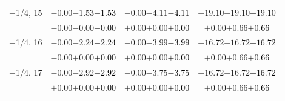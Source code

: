 \documentclass[compress]{beamer}
\begin{document}
\begin{frame}
\begin{tabular}{r | c | c | c}
$-$1/4, 15 & $-0.00$\hspace{0.1 cm}$-1.53$\hspace{0.1 cm}\textcolor{black}{$-1.53$} & $-0.00$\hspace{0.1 cm}$-4.11$\hspace{0.1 cm}\textcolor{black}{$-4.11$} & $+19.10$\hspace{0.1 cm}$+19.10$\hspace{0.1 cm}\textcolor{black}{$+19.10$} \\
           & $-0.00$\hspace{0.1 cm}$-0.00$\hspace{0.1 cm}\textcolor{black}{$-0.00$} & $+0.00$\hspace{0.1 cm}$+0.00$\hspace{0.1 cm}\textcolor{black}{$+0.00$} & $+0.00$\hspace{0.1 cm}$+0.66$\hspace{0.1 cm}\textcolor{black}{$+0.66$} \\
$-$1/4, 16 & $-0.00$\hspace{0.1 cm}$-2.24$\hspace{0.1 cm}\textcolor{black}{$-2.24$} & $-0.00$\hspace{0.1 cm}$-3.99$\hspace{0.1 cm}\textcolor{black}{$-3.99$} & $+16.72$\hspace{0.1 cm}$+16.72$\hspace{0.1 cm}\textcolor{black}{$+16.72$} \\
           & $-0.00$\hspace{0.1 cm}$+0.00$\hspace{0.1 cm}\textcolor{black}{$+0.00$} & $+0.00$\hspace{0.1 cm}$+0.00$\hspace{0.1 cm}\textcolor{black}{$+0.00$} & $+0.00$\hspace{0.1 cm}$+0.66$\hspace{0.1 cm}\textcolor{black}{$+0.66$} \\
$-$1/4, 17 & $-0.00$\hspace{0.1 cm}$-2.92$\hspace{0.1 cm}\textcolor{black}{$-2.92$} & $-0.00$\hspace{0.1 cm}$-3.75$\hspace{0.1 cm}\textcolor{black}{$-3.75$} & $+16.72$\hspace{0.1 cm}$+16.72$\hspace{0.1 cm}\textcolor{black}{$+16.72$} \\
           & $+0.00$\hspace{0.1 cm}$+0.00$\hspace{0.1 cm}\textcolor{black}{$+0.00$} & $+0.00$\hspace{0.1 cm}$+0.00$\hspace{0.1 cm}\textcolor{black}{$+0.00$} & $+0.00$\hspace{0.1 cm}$+0.66$\hspace{0.1 cm}\textcolor{black}{$+0.66$} \\

\end{tabular}
\end{frame}
\end{document}
